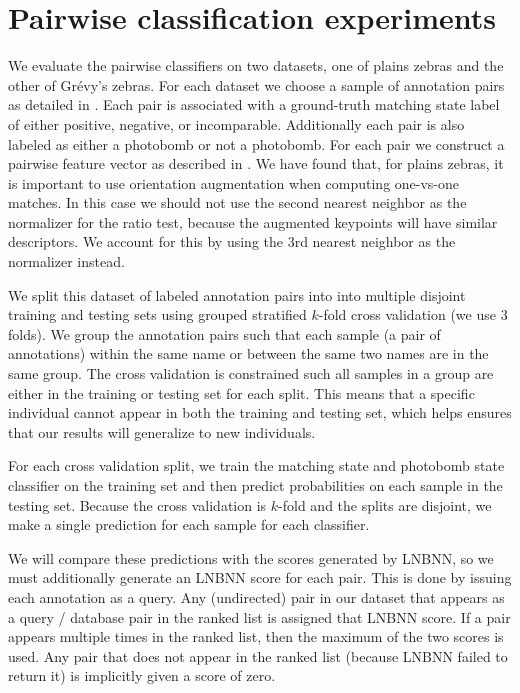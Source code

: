 \section{Pairwise classification experiments}

    We evaluate the pairwise classifiers on two datasets, one of plains zebras
      and the other of Grévy's zebras.
    For each dataset we choose a sample of annotation pairs as detailed in
      .
    Each pair is associated with a ground-truth matching state label of either
      positive, negative, or incomparable.
    Additionally each pair is also labeled as either a photobomb or not a
      photobomb.
    For each pair we construct a pairwise feature vector as described in
      .
    We have found that, for plains zebras, it is important to use orientation
      augmentation when computing one-vs-one matches.
    In this case we should not use the second nearest neighbor as the
      normalizer for the ratio test, because the augmented keypoints will have
      similar descriptors.
    We account for this by using the 3rd nearest neighbor as the normalizer
      instead.

    We split this dataset of labeled annotation pairs into into multiple
      disjoint training and testing sets using grouped stratified $k$-fold cross
      validation (we use $3$ folds).
    We group the annotation pairs such that each sample (a pair of
      annotations) within the same name or between the same two names are in the
      same group.
    The cross validation is constrained such all samples in a group are either
      in the training or testing set for each split.
    This means that a specific individual cannot appear in both the training
      and testing set, which helps ensures that our results will generalize to
      new individuals.

    For each cross validation split, we train the matching state and photobomb
      state classifier on the training set and then predict probabilities on
      each sample in the testing set.
    Because the cross validation is $k$-fold and the splits are disjoint, we
      make a single prediction for each sample for each classifier.

    We will compare these predictions with the scores generated by LNBNN, so
      we must additionally generate an LNBNN score for each pair.
    This is done by issuing each annotation as a query.
    Any (undirected) pair in our dataset that appears as a query / database
      pair in the ranked list is assigned that LNBNN score.
    If a pair appears multiple times in the ranked list, then the maximum of
      the two scores is used.
    Any pair that does not appear in the ranked list (because LNBNN failed to
      return it) is implicitly given a score of zero.


